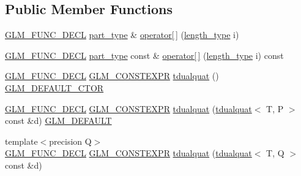 \subsection*{Public Member Functions}
\begin{DoxyCompactItemize}
\item 
\mbox{\hyperlink{setup_8hpp_ab2d052de21a70539923e9bcbf6e83a51}{G\+L\+M\+\_\+\+F\+U\+N\+C\+\_\+\+D\+E\+CL}} \mbox{\hyperlink{structglm_1_1tdualquat_a496a3e08262a28863cf7b0609eee7e5b}{part\+\_\+type}} \& \mbox{\hyperlink{structglm_1_1tdualquat_a249f53dd1ed32db9b6695b10e89de1f6}{operator\mbox{[}$\,$\mbox{]}}} (\mbox{\hyperlink{structglm_1_1tdualquat_a8100706ca94a1aa6611874787a9be0ca}{length\+\_\+type}} i)
\item 
\mbox{\hyperlink{setup_8hpp_ab2d052de21a70539923e9bcbf6e83a51}{G\+L\+M\+\_\+\+F\+U\+N\+C\+\_\+\+D\+E\+CL}} \mbox{\hyperlink{structglm_1_1tdualquat_a496a3e08262a28863cf7b0609eee7e5b}{part\+\_\+type}} const  \& \mbox{\hyperlink{structglm_1_1tdualquat_a2243ffa45b172732765c9a473039ab72}{operator\mbox{[}$\,$\mbox{]}}} (\mbox{\hyperlink{structglm_1_1tdualquat_a8100706ca94a1aa6611874787a9be0ca}{length\+\_\+type}} i) const
\item 
\mbox{\hyperlink{setup_8hpp_ab2d052de21a70539923e9bcbf6e83a51}{G\+L\+M\+\_\+\+F\+U\+N\+C\+\_\+\+D\+E\+CL}} \mbox{\hyperlink{setup_8hpp_a08b807947b47031d3a511f03f89645ad}{G\+L\+M\+\_\+\+C\+O\+N\+S\+T\+E\+X\+PR}} \mbox{\hyperlink{structglm_1_1tdualquat_a4710cde777552996f95958802583dbb6}{tdualquat}} () \mbox{\hyperlink{setup_8hpp_afb97a4e995bc004c0cbbfa22125b80ba}{G\+L\+M\+\_\+\+D\+E\+F\+A\+U\+L\+T\+\_\+\+C\+T\+OR}}
\item 
\mbox{\hyperlink{setup_8hpp_ab2d052de21a70539923e9bcbf6e83a51}{G\+L\+M\+\_\+\+F\+U\+N\+C\+\_\+\+D\+E\+CL}} \mbox{\hyperlink{setup_8hpp_a08b807947b47031d3a511f03f89645ad}{G\+L\+M\+\_\+\+C\+O\+N\+S\+T\+E\+X\+PR}} \mbox{\hyperlink{structglm_1_1tdualquat_aaa1e073067ee609264b4943ab4397d62}{tdualquat}} (\mbox{\hyperlink{structglm_1_1tdualquat}{tdualquat}}$<$ T, P $>$ const \&d) \mbox{\hyperlink{setup_8hpp_aefce7051c376a64ba89fa93a9f63bc2c}{G\+L\+M\+\_\+\+D\+E\+F\+A\+U\+LT}}
\item 
{\footnotesize template$<$precision Q$>$ }\\\mbox{\hyperlink{setup_8hpp_ab2d052de21a70539923e9bcbf6e83a51}{G\+L\+M\+\_\+\+F\+U\+N\+C\+\_\+\+D\+E\+CL}} \mbox{\hyperlink{setup_8hpp_a08b807947b47031d3a511f03f89645ad}{G\+L\+M\+\_\+\+C\+O\+N\+S\+T\+E\+X\+PR}} \mbox{\hyperlink{structglm_1_1tdualquat_af791cc456a60d3b30e0d1ec57602a44b}{tdualquat}} (\mbox{\hyperlink{structglm_1_1tdualquat}{tdualquat}}$<$ T, Q $>$ const \&d)

\end{DoxyCompactItemize}
